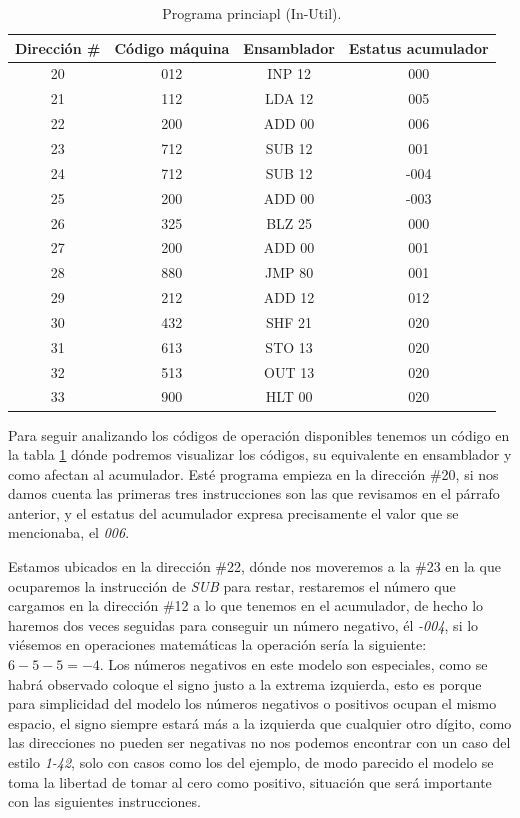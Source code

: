 \documentclass[letterpaper,12pt,oneside]{book}
\begin{document}
	\begin{table}[h]
	  \centering
	  \begin{tabular}{|c|c|c|c|}
	    \hline
    	\textbf{Dirección \#} & \textbf{Código máquina} & \textbf{Ensamblador} & \textbf{Estatus acumulador} \\
	    \hline
	     20 & 012 & INP 12 & 000 \\
	     21 & 112 & LDA 12 & 005\\
	     22 & 200 & ADD 00 & 006\\
	     23 & 712 & SUB 12 & 001\\
	     24 & 712 & SUB 12 & -004\\
	     25 & 200 & ADD 00 & -003\\
	     26 & 325 & BLZ 25 & 000\\
	     27 & 200 & ADD 00 & 001\\
	     28 & 880 & JMP 80 & 001\\
	     29 & 212 & ADD 12 & 012\\
	     30 & 432 & SHF 21 & 020\\
	     31 & 613 & STO 13 & 020\\
	     32 & 513 & OUT 13 & 020\\
	     33 & 900 & HLT 00 & 020\\
	    \hline
	  \end{tabular}
	  \caption{Programa princiapl (In-Util). }
	  \label{tab:Programa_Principal}
	\end{table}
	
	Para seguir analizando los códigos de operación disponibles tenemos un código en la tabla \ref{tab:Programa_Principal} dónde
	podremos visualizar los códigos, su equivalente en ensamblador y como afectan al acumulador. Esté programa empieza en la
	dirección \#20, si nos damos cuenta las primeras tres instrucciones son las que revisamos en el párrafo anterior, y el
	estatus del acumulador expresa precisamente el valor que se mencionaba, el \textit{006}.

	Estamos ubicados en la dirección \#22, dónde nos moveremos a la \#23 en la que ocuparemos la instrucción de \textit{SUB} para restar, restaremos el 
	número que cargamos en la dirección \#12 a lo que tenemos en el acumulador, de hecho lo haremos dos veces seguidas para conseguir un número 	
	negativo, él \textit{-004}, si lo viésemos en operaciones matemáticas la operación sería la siguiente: $ 6-5-5 = -4 $. Los números negativos en este modelo son especiales, 
	como se habrá observado coloque el signo
	justo a la extrema izquierda, esto es porque para simplicidad del modelo los números negativos
	o positivos ocupan el mismo espacio, el signo siempre estará más a la izquierda que cualquier otro dígito, como las direcciones
	no pueden ser negativas no nos podemos encontrar con un caso del estilo \textit{1-42}, solo con casos como los del ejemplo, de modo
	parecido el modelo se toma la libertad de tomar al cero como positivo, situación que será importante con las siguientes instrucciones.
	
\end{document}
